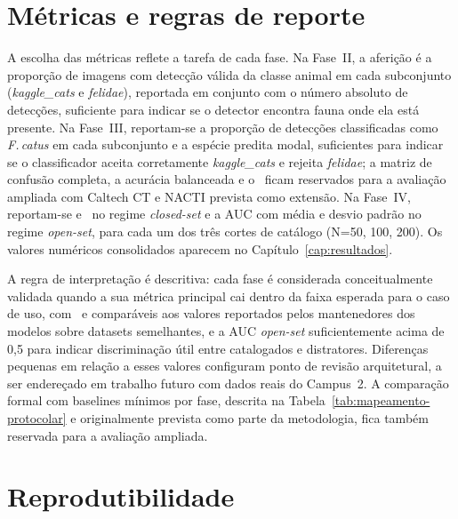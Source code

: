\section{Métricas e regras de reporte}
\label{sec:metodologia-metricas}

A escolha das métricas reflete a tarefa de cada fase. Na Fase~II, a aferição é a proporção de imagens com detecção válida da classe animal em cada subconjunto (\textit{kaggle\_cats} e \textit{felidae}), reportada em conjunto com o número absoluto de detecções, suficiente para indicar se o detector encontra fauna onde ela está presente. Na Fase~III, reportam-se a proporção de detecções classificadas como \textit{F.\,catus} em cada subconjunto e a espécie predita modal, suficientes para indicar se o classificador aceita corretamente \textit{kaggle\_cats} e rejeita \textit{felidae}; a matriz de confusão completa, a acurácia balanceada e o \Fscore\ ficam reservados para a avaliação ampliada com Caltech CT e NACTI prevista como extensão. Na Fase~IV, reportam-se  e \mAP\ no regime \textit{closed-set} e a AUC com média e desvio padrão no regime \textit{open-set}, para cada um dos três cortes de catálogo (N=50, 100, 200). Os valores numéricos consolidados aparecem no Capítulo~\ref{cap:resultados}.

A regra de interpretação é descritiva: cada fase é considerada conceitualmente validada quando a sua métrica principal cai dentro da faixa esperada para o caso de uso, com \mAP\ e  comparáveis aos valores reportados pelos mantenedores dos modelos sobre datasets semelhantes, e a AUC \textit{open-set} suficientemente acima de 0,5 para indicar discriminação útil entre catalogados e distratores. Diferenças pequenas em relação a esses valores configuram ponto de revisão arquitetural, a ser endereçado em trabalho futuro com dados reais do Campus~2. A comparação formal com baselines mínimos por fase, descrita na Tabela~\ref{tab:mapeamento-protocolar} e originalmente prevista como parte da metodologia, fica também reservada para a avaliação ampliada.

\section{Reprodutibilidade}
\label{sec:metodologia-reprodutibilidade}

